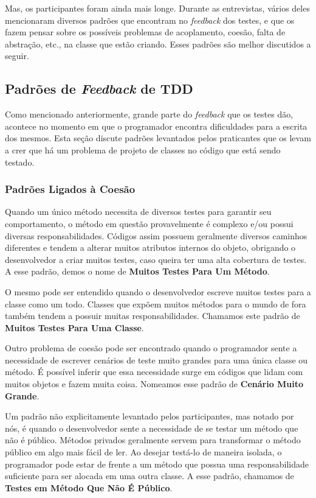\documentclass[conference]{IEEEtran}
\begin{document}
Mas, os participantes foram ainda mais longe. Durante as entrevistas,
vários deles mencionaram diversos padrões que encontram no \textit{feedback} dos testes,
e que os fazem pensar sobre os possíveis problemas de acoplamento,
coesão, falta de abstração, etc., na classe que estão criando.
Esses padrões são melhor discutidos a seguir.

\subsection{Padrões de \textit{Feedback} de TDD}
\label{padroes-tdd}

Como mencionado anteriormente, grande parte do \textit{feedback} que os testes
dão, acontece no momento em que o programador encontra dificuldades para a
escrita dos mesmos. Esta seção discute padrões levantados pelos praticantes
que os levam a crer que há um problema de projeto de classes no código
que está sendo testado.

\subsubsection{Padrões Ligados à Coesão}

Quando um único método necessita de diversos testes para garantir seu comportamento,
o método em questão provavelmente é complexo e/ou possui diversas responsabilidades.
Códigos assim possuem geralmente diversos caminhos
diferentes e tendem a alterar muitos atributos internos do objeto, obrigando o desenvolvedor
a criar muitos testes, caso queira ter uma alta cobertura de testes.
A esse padrão, demos o nome de \textbf{Muitos Testes Para Um Método}.

O mesmo pode ser entendido quando o desenvolvedor escreve muitos testes para a 
classe como um todo. Classes que expõem muitos métodos para o mundo de fora
também tendem a possuir muitas responsabilidades. Chamamos este padrão
de \textbf{Muitos Testes Para Uma Classe}.

Outro problema de coesão pode ser encontrado quando o programador
sente a necessidade de escrever cenários de teste muito grandes para uma
única classe ou método. É possível inferir que essa necessidade surge 
em códigos que lidam com muitos objetos e fazem muita coisa. Nomeamos
esse padrão de \textbf{Cenário Muito Grande}.

Um padrão não explicitamente levantado pelos participantes, mas notado
por nós, é quando o desenvolvedor sente a necessidade de se testar
um método que não é público. Métodos privados geralmente servem para 
transformar o método público em algo mais fácil de ler. Ao desejar
testá-lo de maneira isolada, o programador pode estar de frente a
um método que possua uma responsabilidade suficiente para ser
alocada em uma outra classe. A esse padrão, chamamos de 
\textbf{Testes em Método Que Não É Público}.
\end{document}
